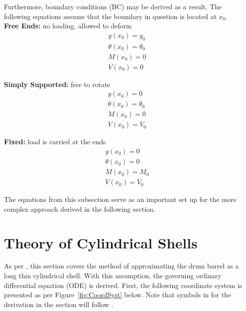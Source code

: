 Furthermore, boundary conditions (BC) may be derived as a result. The following equations assume that the boundary in question is located at $x_0$.\\

\textbf{Free Ends:} no loading, allowed to deform\\
\begin{equation}
	\label{eq:2_freeBC}
	\begin{aligned}
		y(x_0) = y_0          \\
		\theta(x_0)= \theta_0 \\
		M(x_0) = 0            \\
		V(x_0) = 0            
	\end{aligned}
\end{equation}

\textbf{Simply Supported:} free to rotate\\
\begin{equation}
	\label{eq:2_endBC}
	\begin{aligned}
		y(x_0)= 0            \\
		\theta(x_0)=\theta_0 \\
		M(x_0)= 0            \\
		V(x_0) =V_0          
	\end{aligned}
\end{equation}

\textbf{Fixed:} load is carried at the ends\\
\begin{equation}
	\label{eq:2_fixedBC}
	\begin{aligned}
		y(x_0)=0      \\
		\theta(x_0)=0 \\
		M(x_0)=M_0    \\
		V(x_0) =V_0   
	\end{aligned}
\end{equation}

The equations from this subsection serve as an important set up for the more complex approach derived in the following section. 

\section{Theory of Cylindrical Shells}
\label{section:3_shells}

As per \cite{timoshenko1959theory}, this section covers the method of approximating the drum barrel as a long thin cylindrical shell. With this assumption, the governing ordinary differential equation (ODE) is derived. First, the following coordinate system is presented as per Figure~\ref{fig:CoordSyst} below. Note that symbols in for the derivation in the section will follow \cite{timoshenko1959theory}.

